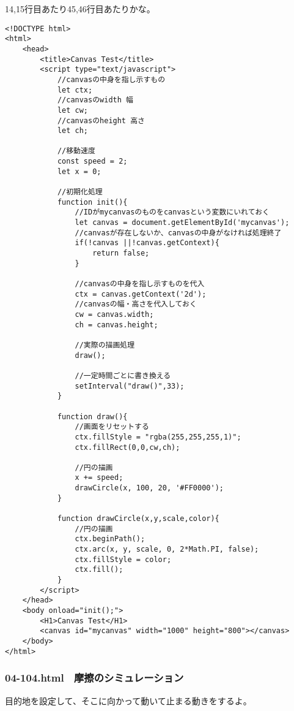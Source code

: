 \documentclass[mingoth,11pt,a4j,uplatex]{jsarticle}
\begin{document}
14,15行目あたり45,46行目あたりかな。
\begin{lstlisting}[caption=等速度運動]
<!DOCTYPE html>
<html>
	<head>
		<title>Canvas Test</title>
		<script type="text/javascript">
			//canvasの中身を指し示すもの
			let ctx;
			//canvasのwidth 幅
			let cw;
			//canvasのheight 高さ
			let ch;
			
			//移動速度
			const speed = 2;
			let x = 0;
			
			//初期化処理
			function init(){
				//IDがmycanvasのものをcanvasという変数にいれておく
				let canvas = document.getElementById('mycanvas');
				//canvasが存在しないか、canvasの中身がなければ処理終了
				if(!canvas ||!canvas.getContext){
					return false;
				}
				
				//canvasの中身を指し示すものを代入
				ctx = canvas.getContext('2d');
				//canvasの幅・高さを代入しておく
				cw = canvas.width;
				ch = canvas.height;
				
				//実際の描画処理
				draw();
				
				//一定時間ごとに書き換える
				setInterval("draw()",33);
			}
			
			function draw(){
				//画面をリセットする
				ctx.fillStyle = "rgba(255,255,255,1)";
				ctx.fillRect(0,0,cw,ch);
				
				//円の描画
				x += speed;
				drawCircle(x, 100, 20, '#FF0000');
			}
			
			function drawCircle(x,y,scale,color){
				//円の描画
				ctx.beginPath();
				ctx.arc(x, y, scale, 0, 2*Math.PI, false);
				ctx.fillStyle = color;
				ctx.fill();
			}
		</script>
	</head>
	<body onload="init();">
		<H1>Canvas Test</H1>
		<canvas id="mycanvas" width="1000" height="800"></canvas>
	</body>
</html>
\end{lstlisting}

\subsubsection{04-104.html　摩擦のシミュレーション}
目的地を設定して、そこに向かって動いて止まる動きをするよ。
\end{document}
